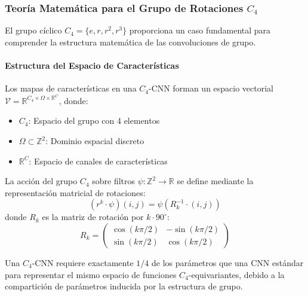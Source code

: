 \subsubsection{Teoría Matemática para el Grupo de Rotaciones $C_4$}

El grupo cíclico $C_4 = \{e, r, r^2, r^3\}$ proporciona un caso fundamental para comprender la estructura matemática de las convoluciones de grupo.

\paragraph{Estructura del Espacio de Características}

Los mapas de características en una $C_4$-CNN forman un espacio vectorial $\mathcal{V} = \mathbb{R}^{C_4 \times \Omega \times \mathbb{R}^C}$, donde:
\begin{itemize}
    \item $C_4$: Espacio del grupo con 4 elementos
    \item $\Omega \subset \mathbb{Z}^2$: Dominio espacial discreto 
    \item $\mathbb{R}^C$: Espacio de canales de características
\end{itemize}

\begin{definition}
La acción del grupo $C_4$ sobre filtros $\psi: \mathbb{Z}^2 \to \mathbb{R}$ se define mediante la representación matricial de rotaciones:
\begin{equation}
(r^k \cdot \psi)(i,j) = \psi(R_k^{-1} \cdot (i,j))
\end{equation}
donde $R_k$ es la matriz de rotación por $k \cdot 90^\circ$:
\begin{equation}
R_k = \begin{pmatrix}
\cos(k\pi/2) & -\sin(k\pi/2) \\
\sin(k\pi/2) & \cos(k\pi/2)
\end{pmatrix}
\end{equation}
\end{definition}

\begin{theorem}
Una $C_4$-CNN requiere exactamente $1/4$ de los parámetros que una CNN estándar para representar el mismo espacio de funciones $C_4$-equivariantes, debido a la compartición de parámetros inducida por la estructura de grupo.
\end{theorem}

